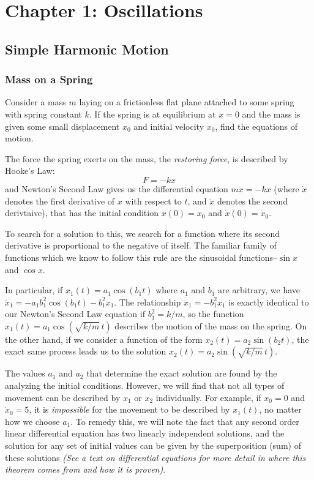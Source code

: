 \chapter{Chapter 1: Oscillations}
\section{Simple Harmonic Motion}
\subsection*{Mass on a Spring}
Consider a mass $m$ laying on a frictionless flat plane attached to some spring with spring constant $k$. If the spring is at equilibrium at $x=0$ and the mass is given some small displacement $x_0$ and initial velocity $\dot x_0$, find the equations of motion.

The force the spring exerts on the mass, the \textit{restoring force}, is described by Hooke's Law:
\[ F = -kx \]
and Newton's Second Law gives us the differential equation $m\ddot x = - kx $ (where $\dot x$ denotes the first derivative of $x$ with respect to $t$, and $\ddot x$ denotes the second derivtaive), that has the initial condition $x(0) = x_0$ and $\dot x(0) = \dot x_0$.

To search for a solution to this, we search for a function where its second derivative is proportional to the negative of itself. The familiar family of functions which we know to follow this rule are the sinusoidal functions--$\sin x$ and $\cos x$. 

In particular, if $x_1(t) = a_1\cos(b_1t)$ where $a_1$ and $b_1$ are arbitrary, we have $\ddot x_1 = -a_1b_1^2\cos(b_1t) - b_1^2x_1$. The relationship $\ddot x_1 = -b_1^2x_1$ is exactly identical to our Newton's Second Law equation if $b_1^2 = k/m$, so the function $x_1(t) = a_1\cos(\sqrt{k/m} \, t)$ describes the motion of the mass on the spring. On the other hand, if we consider a function of the form $x_2(t) = a_2\sin(b_2t)$, the exact same process leads us to the solution $x_2(t) = a_2\sin(\sqrt{k/m}\, t)$.

The values $a_1$ and $a_2$ that determine the exact solution are found by the analyzing the initial conditions. However, we will find that not all types of movement can be described by $x_1$ or $x_2$ individually. For example, if $x_0 = 0$ and $\dot x_0 = 5$, it is \textit{impossible} for the movement to be described by $x_1(t)$, no matter how we choose $a_1$. To remedy this, we will note the fact that any second order linear differential equation has two linearly independent solutions, and the solution for any set of initial values can be given by the superposition (sum) of these solutions \textit{(See a text on differential equations for more detail in where this theorem comes from and how it is proven)}.

